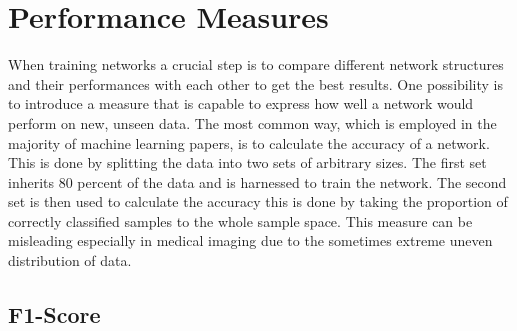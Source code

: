 \documentclass[
a4paper, 
12pt,
grayscalebody, %
abstract=on,
twoside, BCOR10mm, 12pt, DIV13,headinclude, footexclude, final, abstracton, openright
]{ibireprt}
\numberwithin{equation}{chapter}
\numberwithin{table}{chapter}
\numberwithin{figure}{chapter}
\numberwithin{algorithm}{chapter}
\numberwithin{example}{chapter}
\numberwithin{example}{chapter}
\begin{document}

\section{Performance Measures}
When training networks a crucial step is to compare different network structures and their performances with each other to get the best results. One possibility is to introduce a measure that is capable to express how well a network would perform on new, unseen data. The most common way, which is employed in the majority of machine learning papers, is to calculate the accuracy of a network. This is done by splitting the data into two sets of arbitrary sizes. The first set inherits 80 percent of the data and is harnessed to train the network. The second set is then used to calculate the accuracy this is done by taking the proportion of correctly classified samples to the whole sample space. This measure can be misleading especially in medical imaging due to the sometimes extreme uneven distribution of data. 


\subsection{F1-Score}
\end{document}
